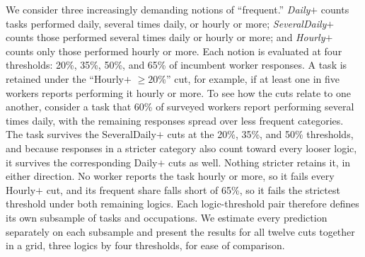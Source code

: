 We consider three increasingly demanding notions of ``frequent.''
\emph{Daily$+$} counts tasks performed daily, several times daily, or hourly or more; \emph{SeveralDaily$+$} counts those performed several times daily or hourly or more; and \emph{Hourly$+$} counts only those performed hourly or more.
Each notion is evaluated at four thresholds: 20\%, 35\%, 50\%, and 65\% of incumbent worker responses.
A task is retained under the ``Hourly$+$ $\geq 20\%$'' cut, for example, if at least one in five workers reports performing it hourly or more.
To see how the cuts relate to one another, consider a task that 60\% of surveyed workers report performing several times daily, with the remaining responses spread over less frequent categories.
The task survives the SeveralDaily$+$ cuts at the 20\%, 35\%, and 50\% thresholds, and because responses in a stricter category also count toward every looser logic, it survives the corresponding Daily$+$ cuts as well.
Nothing stricter retains it, in either direction. No worker reports the task hourly or more, so it fails every Hourly$+$ cut, and its frequent share falls short of 65\%, so it fails the strictest threshold under both remaining logics.
Each logic-threshold pair therefore defines its own subsample of tasks and occupations.
We estimate every prediction separately on each subsample and present the results for all twelve cuts together in a grid, three logics by four thresholds, for ease of comparison.

